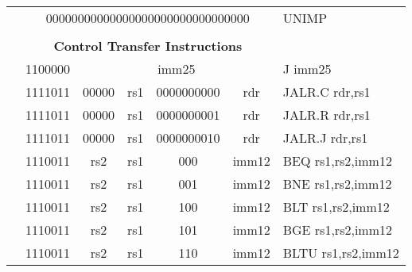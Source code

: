 \begin{table}[p]
\begin{small}
\begin{center}
\begin{tabular}{rcccccccccccl}
&
\multicolumn{11}{|c|}{00000000000000000000000000000000} & UNIMP \\
\cline{2-12}
  

&
\multicolumn{11}{c}{} & \\
&
\multicolumn{11}{c}{\bf Control Transfer Instructions} & \\
\cline{2-12}
  

&
\multicolumn{1}{|c|}{1100000} &
\multicolumn{10}{c|}{imm25} & J imm25 \\
\cline{2-12}
  

&
\multicolumn{2}{|c|}{1111011} &
\multicolumn{1}{c|}{00000} &
\multicolumn{1}{c|}{rs1} &
\multicolumn{6}{c|}{0000000000} &
\multicolumn{1}{c|}{rdr} & JALR.C rdr,rs1 \\
\cline{2-12}
  

&
\multicolumn{2}{|c|}{1111011} &
\multicolumn{1}{c|}{00000} &
\multicolumn{1}{c|}{rs1} &
\multicolumn{6}{c|}{0000000001} &
\multicolumn{1}{c|}{rdr} & JALR.R rdr,rs1 \\
\cline{2-12}
  

&
\multicolumn{2}{|c|}{1111011} &
\multicolumn{1}{c|}{00000} &
\multicolumn{1}{c|}{rs1} &
\multicolumn{6}{c|}{0000000010} &
\multicolumn{1}{c|}{rdr} & JALR.J rdr,rs1 \\
\cline{2-12}
  

&
\multicolumn{2}{|c|}{1110011} &
\multicolumn{1}{c|}{rs2} &
\multicolumn{1}{c|}{rs1} &
\multicolumn{2}{c|}{000} &
\multicolumn{5}{c|}{imm12} & BEQ rs1,rs2,imm12 \\
\cline{2-12}
  

&
\multicolumn{2}{|c|}{1110011} &
\multicolumn{1}{c|}{rs2} &
\multicolumn{1}{c|}{rs1} &
\multicolumn{2}{c|}{001} &
\multicolumn{5}{c|}{imm12} & BNE rs1,rs2,imm12 \\
\cline{2-12}
  

&
\multicolumn{2}{|c|}{1110011} &
\multicolumn{1}{c|}{rs2} &
\multicolumn{1}{c|}{rs1} &
\multicolumn{2}{c|}{100} &
\multicolumn{5}{c|}{imm12} & BLT rs1,rs2,imm12 \\
\cline{2-12}
  

&
\multicolumn{2}{|c|}{1110011} &
\multicolumn{1}{c|}{rs2} &
\multicolumn{1}{c|}{rs1} &
\multicolumn{2}{c|}{101} &
\multicolumn{5}{c|}{imm12} & BGE rs1,rs2,imm12 \\
\cline{2-12}
  

&
\multicolumn{2}{|c|}{1110011} &
\multicolumn{1}{c|}{rs2} &
\multicolumn{1}{c|}{rs1} &
\multicolumn{2}{c|}{110} &
\multicolumn{5}{c|}{imm12} & BLTU rs1,rs2,imm12 \\
\cline{2-12}
  


\end{tabular}
\end{center}
\end{small}
\end{table}

